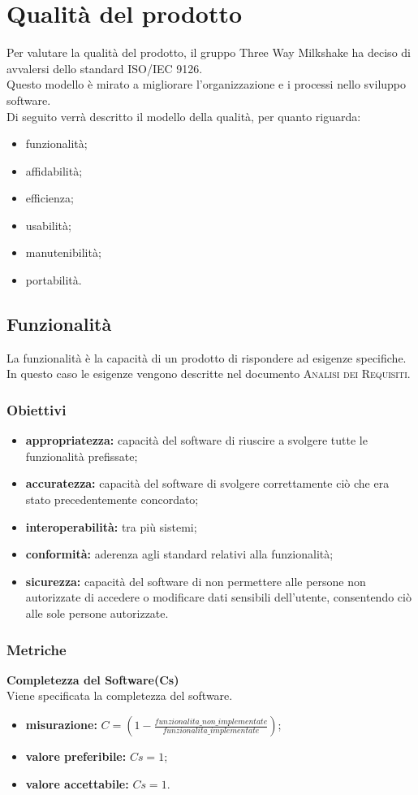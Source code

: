 \section{Qualità del prodotto}
Per valutare  la qualità del prodotto, il gruppo Three Way Milkshake ha deciso di avvalersi dello standard ISO/IEC 9126.\\
Questo modello è mirato a  migliorare l'organizzazione e i processi nello sviluppo software.\\
Di seguito verrà descritto il modello della qualità, per quanto riguarda:
\begin{itemize}
	\item funzionalità;
	\item affidabilità;
	\item efficienza;
	\item usabilità;
	\item manutenibilità;
	\item portabilità.
\end{itemize}

\subsection{Funzionalità}
La funzionalità è la capacità di un prodotto di rispondere ad esigenze specifiche.\\
In questo caso le esigenze vengono descritte nel documento \textsc{Analisi dei Requisiti}.
\subsubsection{Obiettivi}
\begin{itemize}
	\item \textbf{appropriatezza:} capacità del software di riuscire a svolgere tutte le funzionalità prefissate;
	\item \textbf{accuratezza:} capacità del software di svolgere correttamente ciò che era stato precedentemente concordato;
	\item \textbf{interoperabilità:} tra più sistemi;
	\item \textbf{conformità:} aderenza agli standard relativi alla funzionalità;
	\item \textbf{sicurezza:} capacità del software di non permettere alle persone non autorizzate di accedere o modificare dati sensibili dell'utente, consentendo ciò alle sole persone autorizzate.
\end{itemize}

\subsubsection{Metriche}
\textbf{Completezza del Software(Cs)}\\
Viene specificata la completezza del software.
\begin{itemize}
	\item \textbf{misurazione:} $C = (1- \frac{funzionalita\_non\_implementate }{funzionalita\_implementate})$;
	\item \textbf{valore preferibile:} $Cs = 1$;
	\item \textbf{valore accettabile:} $Cs = 1$.
\end{itemize}
\pagebreak
